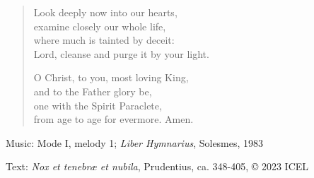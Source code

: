 \hymn



\setlength{\leftmargini}{2em}
\begin{verse}
Look deeply now into our hearts,\\
examine closely our whole life,\\
where much is tainted by deceit:\\
Lord, cleanse and purge it by your light.

O Christ, to you, most loving King,\\
and to the Father glory be,\\
one with the Spirit Paraclete,\\
from age to age for evermore. Amen.
\end{verse}

\begin{hymnsource}
Music: Mode I, melody 1; \emph{Liber Hymnarius}, Solesmes, 1983

Text: \emph{Nox et tenebræ et nubila}, Prudentius, ca. 348-405, © 2023 ICEL
\end{hymnsource}
